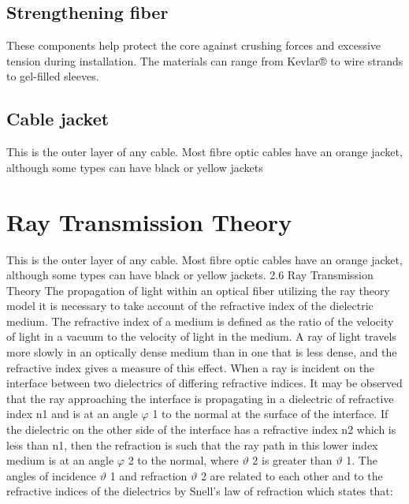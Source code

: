 \documentclass[12pt]{report}
\begin{document}
	\subsection*{ Strengthening fiber } 
	These components help protect the core against crushing forces and excessive tension during installation. The materials can range from Kevlar® to wire strands to gel-filled sleeves. 
	\subsection*{Cable jacket}
	This is the outer layer of any cable. Most fibre optic cables have an orange jacket, although some types can have black or yellow jackets
	\section{Ray Transmission Theory}
	This is the outer layer of any cable. Most fibre optic cables have an orange jacket, although some types can have black or yellow jackets. 2.6 Ray Transmission Theory 
	The propagation of light within an optical fiber utilizing the ray theory model it is necessary to take account of the refractive index of the dielectric medium. The refractive index of a medium is defined as the ratio of the velocity of light in a vacuum to the velocity of light in the medium. A ray of light travels more slowly in an optically dense medium than in one that is less dense, and the refractive index gives a measure of this effect. When a ray is incident on the interface between two dielectrics of differing refractive indices. It may be observed that the ray approaching the interface is propagating in a dielectric of refractive index n1 and is at an angle $\varphi$ 1 to the normal at the surface of the interface. If the dielectric on the other side of the interface has a refractive index n2 which is less than n1, then the refraction is such that the ray path in this lower index medium is at an angle $\varphi$ 2 to the normal, where $\vartheta$ 2 is greater than $\vartheta$ 1. The angles of incidence $\vartheta$ 1 and refraction $\vartheta$ 2 are related to each other and to the refractive indices of the dielectrics by Snell’s law of refraction which states that:
\end{document}
